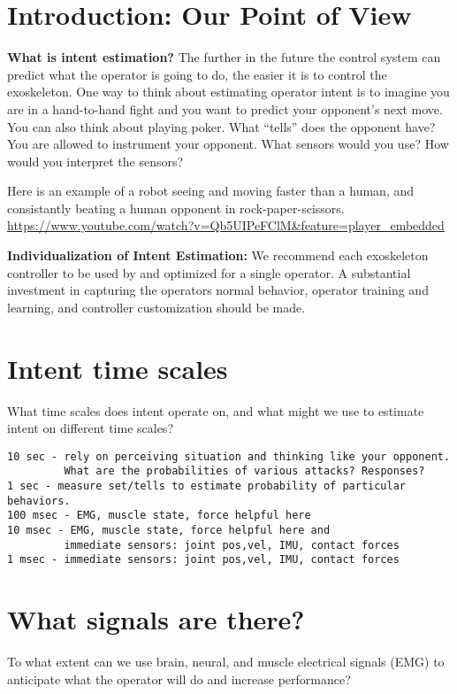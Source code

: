 \documentclass[letterpaper,12pt,fullpage]{article}
\begin{document}
\section{Introduction: Our Point of View}

{\bf What is intent estimation?}
The further in the future the control system can predict what the operator
is going to do, the easier it is to control the exoskeleton. One way
to think about estimating operator intent is to imagine you are in
a hand-to-hand fight and you want to predict your opponent's next move.
You can also think about playing poker. What ``tells'' does the opponent
have?
You are allowed to instrument your opponent. What sensors would you use?
How would you interpret the sensors?

Here is an example of a robot seeing and moving faster than a human, and
consistantly beating a human opponent in rock-paper-scissors.
\url{https://www.youtube.com/watch?v=Qb5UIPeFClM&feature=player_embedded}

{\bf Individualization of Intent Estimation:}
We recommend each exoskeleton controller
to be used by and optimized for a single operator.
A substantial investment in capturing the operators normal behavior,
operator training and learning, and controller customization should be made.

\section{Intent time scales}

What time scales does intent operate on, and what might we use
to estimate intent on different time scales?

\begin{verbatim}
10 sec - rely on perceiving situation and thinking like your opponent.
         What are the probabilities of various attacks? Responses?
1 sec - measure set/tells to estimate probability of particular behaviors.
100 msec - EMG, muscle state, force helpful here
10 msec - EMG, muscle state, force helpful here and
         immediate sensors: joint pos,vel, IMU, contact forces
1 msec - immediate sensors: joint pos,vel, IMU, contact forces
\end{verbatim}

\section{What signals are there?}

To what extent can we use brain, neural, and muscle electrical signals
(EMG) to anticipate what the operator will do and increase performance?
\end{document}
